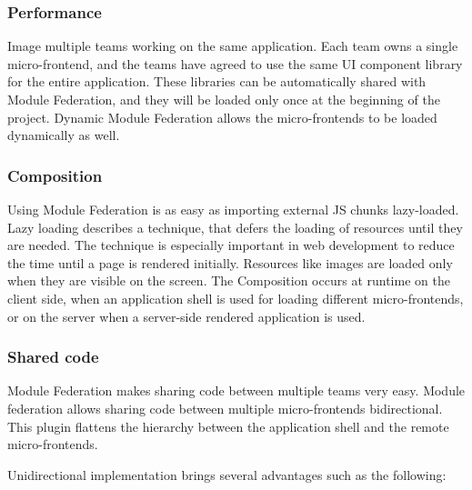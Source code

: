 \subsubsection{Performance}\label{subsubsection:background:micro-frontend:module-federation:performance}

Image multiple teams working on the same application. Each team owns a single micro-frontend, and the teams have agreed to use the same \ac{UI} component library for the entire application. These libraries can be automatically shared with Module Federation, and they will be loaded only once at the beginning of the project. Dynamic Module Federation allows the micro-frontends to be loaded dynamically as well. \cite[83]{book:2021:mezzalira:applied-methods:building-micro-frontends}

\subsubsection{Composition}\label{subsubsection:background:micro-frontend:module-federation:composition}

Using Module Federation is as easy as importing external \ac{JS} chunks lazy-loaded. Lazy loading describes a technique, that defers the loading of resources until they are needed. The technique is especially important in web development to reduce the time until a page is rendered initially. Resources like images are loaded only when they are visible on the screen. The Composition occurs at runtime on the client side, when an application shell is used for loading different micro-frontends, or on the server when a server-side rendered application is used. \cite[84]{book:2021:mezzalira:applied-methods:building-micro-frontends}

\subsubsection{Shared code}\label{subsubsection:background:micro-frontend:module-federation:shared-code}

Module Federation makes sharing code between multiple teams very easy. Module federation allows sharing code between multiple micro-frontends bidirectional. This plugin flattens the hierarchy between the application shell and the remote micro-frontends.

\noindent Unidirectional implementation brings several advantages such as the following: \cite[84]{book:2021:mezzalira:applied-methods:building-micro-frontends}

